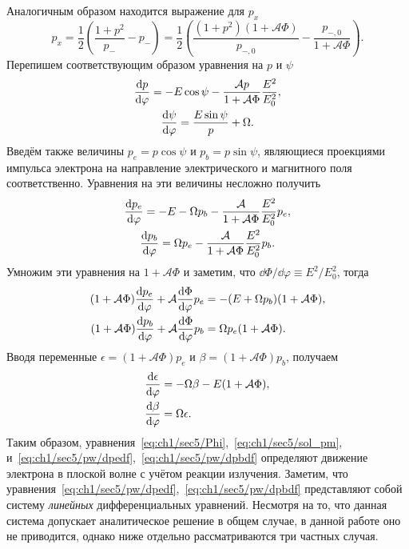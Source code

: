 Аналогичным образом находится выражение для $p_x$
\begin{equation}
    \label{eq:ch1/sec5/sol_px}
    p_x = \frac{1}{2} \left( \frac{1+p^2}{p_-} - p_- \right)= \frac{1}{2} \left( \frac{(1+p^2)(1 + \mathcal{A}\Phi)}{p_{-,0}} - \frac{p_{-,0}}{1 + \mathcal{A}\Phi} \right).
\end{equation}
Перепишем соответствующим образом уравнения на $p$ и $\psi$
\begin{gather}
    \label{eq:ch1/sec5/pw/dpdf}
    \dv{p}{\varphi} = -E\cos\psi - \frac{\mathcal{A} p}{1 + \mathcal{A}\Phi} \frac{E^2}{E_0^2} ,\\
    \label{eq:ch1/sec5/pw/dpsidf}
    \dv{\psi}{\varphi} =  \frac{E\sin\psi}{p} + \Omega .
\end{gather}
Введём также величины $p_e = p\cos\psi$ и $p_b = p\sin\psi$, являющиеся проекциями импульса электрона на направление электрического и магнитного поля соответственно.
Уравнения на эти величины несложно получить
\begin{gather}
    \dv{p_e}{\varphi} = -E - \Omega p_b - \frac{\mathcal{A}}{1 + \mathcal{A}\Phi} \frac{E^2}{E_0^2} p_e, \\
    \dv{p_b}{\varphi} = \Omega p_e - \frac{\mathcal{A} }{1 + \mathcal{A}\Phi} \frac{E^2}{E_0^2} p_b.
\end{gather}
Умножим эти уравнения на $1+\mathcal{A}\Phi$ и заметим, что $\dd\Phi/\dd\varphi\equiv E^2/E_0^2$, тогда
\begin{align}
    (1+\mathcal{A}\Phi)\dv{p_e}{\varphi} + \mathcal{A}\dv{\Phi}{\varphi}p_e &= -(E + \Omega p_b)(1+\mathcal{A}\Phi), \\
    (1+\mathcal{A}\Phi)\dv{p_b}{\varphi} + \mathcal{A}\dv{\Phi}{\varphi}p_b &= \Omega p_e (1+\mathcal{A}\Phi).
\end{align}
Вводя переменные $\epsilon = (1 + \mathcal{A}\Phi)p_e$ и $\beta = (1 + \mathcal{A}\Phi)p_b$, получаем
\begin{align}
    \label{eq:ch1/sec5/pw/dpedf}
    \dv{\epsilon}{\varphi} &= - \Omega \beta -E (1+\mathcal{A}\Phi) , \\
    \label{eq:ch1/sec5/pw/dpbdf}
    \dv{\beta}{\varphi} &= \Omega \epsilon.
\end{align}
Таким образом, уравнения~\eqref{eq:ch1/sec5/Phi},~\eqref{eq:ch1/sec5/sol_pm}, и~\eqref{eq:ch1/sec5/pw/dpedf},~\eqref{eq:ch1/sec5/pw/dpbdf} определяют движение электрона в плоской волне с учётом реакции излучения.
Заметим, что уравнения~\eqref{eq:ch1/sec5/pw/dpedf},~\eqref{eq:ch1/sec5/pw/dpbdf} представляют собой систему \textit{линейных} дифференциальных уравнений.
Несмотря на то, что данная система допускает аналитическое решение в общем случае, в данной работе оно не приводится, однако ниже отдельно рассматриваются три частных случая. 

